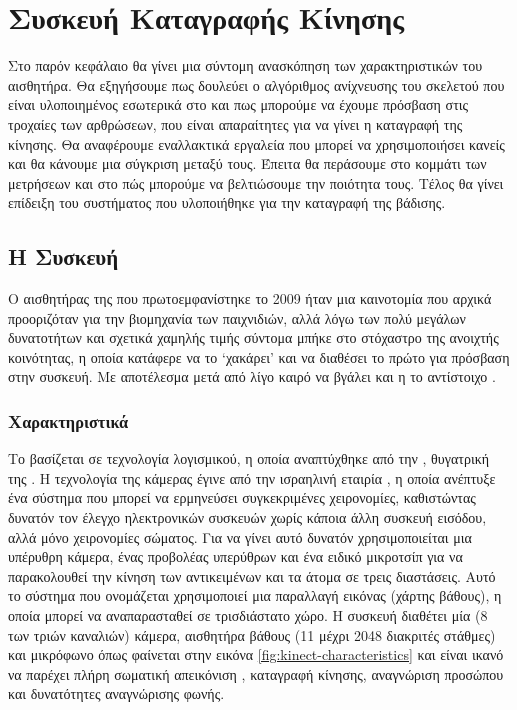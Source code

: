 \chapter{Συσκευή Καταγραφής Κίνησης}

Στο παρόν κεφάλαιο θα γίνει μια σύντομη ανασκόπηση των χαρακτηριστικών του αισθητήρα. Θα εξηγήσουμε πως δουλεύει ο αλγόριθμος ανίχνευσης του σκελετού που είναι υλοποιημένος εσωτερικά στο  και πως μπορούμε να έχουμε πρόσβαση στις τροχαίες των αρθρώσεων, που είναι απαραίτητες για να γίνει η καταγραφή της κίνησης. Θα αναφέρουμε εναλλακτικά εργαλεία που μπορεί να χρησιμοποιήσει κανείς και θα κάνουμε μια σύγκριση μεταξύ τους. Έπειτα θα περάσουμε στο κομμάτι των μετρήσεων και στο πώς μπορούμε να βελτιώσουμε την ποιότητα τους. Τέλος θα γίνει επίδειξη του συστήματος που υλοποιήθηκε για την καταγραφή της βάδισης.

\section{\texorpdfstring{Η Συσκευή }{}}

Ο αισθητήρας της  που πρωτοεμφανίστηκε το 2009 ήταν μια καινοτομία που αρχικά προοριζόταν για την βιομηχανία των παιχνιδιών, αλλά λόγω των πολύ μεγάλων δυνατοτήτων και σχετικά χαμηλής τιμής σύντομα μπήκε στο στόχαστρο της ανοιχτής κοινότητας, η οποία κατάφερε να το \lq χακάρει\rq \; και να διαθέσει το πρώτο  για πρόσβαση στην συσκευή. Με αποτέλεσμα μετά από λίγο καιρό να βγάλει και η  το αντίστοιχο .

\subsection{Χαρακτηριστικά}

Το  βασίζεται σε τεχνολογία λογισμικού, η οποία αναπτύχθηκε από την , θυγατρική της . Η τεχνολογία της κάμερας έγινε από την ισραηλινή εταιρία , η οποία ανέπτυξε ένα σύστημα που μπορεί να ερμηνεύσει συγκεκριμένες χειρονομίες, καθιστώντας δυνατόν τον έλεγχο ηλεκτρονικών συσκευών χωρίς κάποια άλλη συσκευή εισόδου, αλλά μόνο χειρονομίες σώματος. Για να γίνει αυτό δυνατόν χρησιμοποιείται μια υπέρυθρη κάμερα, ένας προβολέας υπερύθρων και ένα ειδικό μικροτσίπ για να παρακολουθεί την κίνηση των αντικειμένων και τα άτομα σε τρεις διαστάσεις. Αυτό το σύστημα  που ονομάζεται  χρησιμοποιεί μια παραλλαγή εικόνας (χάρτης βάθους), η οποία μπορεί να αναπαρασταθεί σε τρισδιάστατο χώρο. Η συσκευή διαθέτει μία  (8\- των τριών καναλιών) κάμερα, αισθητήρα βάθους (11\- μέχρι 2048 διακριτές στάθμες) και  μικρόφωνο όπως φαίνεται στην εικόνα \ref{fig:kinect-characteristics} και είναι ικανό να παρέχει πλήρη σωματική απεικόνιση , καταγραφή κίνησης, αναγνώριση προσώπου και δυνατότητες αναγνώρισης φωνής.

